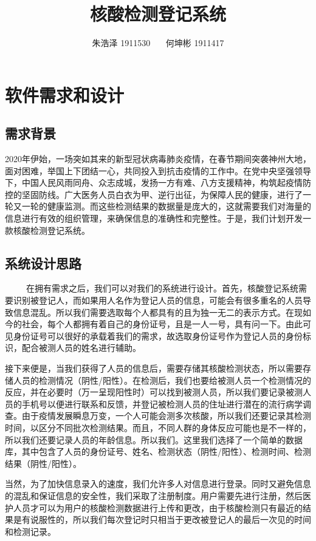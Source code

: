 \documentclass{article}
\begin{document}
\title{核酸检测登记系统}
\author{朱浩泽 1911530 \ \ \ 何坤彬 1911417}
\maketitle
\section{软件需求和设计}
\large
\subsection{需求背景}
2020年伊始，一场突如其来的新型冠状病毒肺炎疫情，在春节期间突袭神州大地，面对困难，举国上下团结一心，共同投入到抗击疫情的工作中。在党中央坚强领导下，中国人民风雨同舟、众志成城，发扬一方有难、八方支援精神，构筑起疫情防控的坚固防线。广大医务人员白衣为甲、逆行出征，为保障人民的健康，进行了一轮又一轮的健康监测。而这些检测结果的数据量是庞大的，这就需要我们对海量的信息进行有效的组织管理，来确保信息的准确性和完整性。于是，我们计划开发一款核酸检测登记系统。
\subsection{系统设计思路}
\ \ \ \ \ 在拥有需求之后，我们可以对我们的系统进行设计。首先，核酸登记系统需要识别被登记人，而如果用人名作为登记人员的信息，可能会有很多重名的人员导致信息混乱。所以我们需要选取每个人都具有的且为独一无二的表示方式。在现如今的社会，每个人都拥有着自己的身份证号，且是一人一号，具有问一下。由此可见身份证号可以很好的承载着我们的需求，故选取身份证号作为登记人员的身份标识，配合被测人员的姓名进行辅助。

接下来便是，当我们获得了人员的信息后，需要存储其核酸检测状态，所以需要存储人员的检测情况（阴性/阳性）。在检测后，我们也要给被测人员一个检测情况的反应，并在必要时（万一呈现阳性时）可以找到被测人员，所以我们要记录被测人员的手机号以便进行联系和反馈，并登记被检测人员的住址进行潜在的流行病学调查。由于疫情发展瞬息万变，一个人可能会测多次核酸，所以我们还要记录其检测时间，以区分不同批次检测结果。而且，不同人群的身体反应可能也是不一样的，所以我们还要记录人员的年龄信息。所以我们。这里我们选择了一个简单的数据库，其中包含了人员的身份证号、姓名、检测状态（阴性/阳性）、检测时间、检测结果（阴性/阳性）。

当然，为了加快信息录入的速度，我们允许多人对信息进行登录。同时又避免信息的混乱和保证信息的安全性，我们采取了注册制度。用户需要先进行注册，然后医护人员才可以为用户的核酸检测数据进行上传和更改，由于核酸检测只有最近的结果是有说服性的，所以我们每次登记时只相当于更改被登记人的最后一次见的时间和检测记录。
\end{document}
